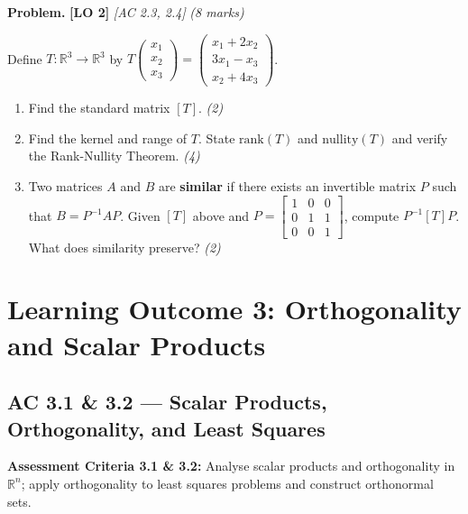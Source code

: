 \documentclass[12pt,a4paper]{article}
\newcommand{\lo}[1]{\textcolor{locolor}{\textbf{[LO #1]}}}
\newcommand{\ac}[1]{\textcolor{locolor}{\textit{[AC #1]}}}
\newcommand{\R}{\mathbb{R}}
\newcommand{\mat}[1]{\begin{bmatrix}#1\end{bmatrix}}
\begin{document}
	\begin{tcolorbox}[practice]
		\textbf{Problem.} \lo{2} \ac{2.3, 2.4} \hfill \textit{(8 marks)}
		
		Define $T:\R^3\to\R^3$ by $T\!\begin{pmatrix}x_1\\x_2\\x_3\end{pmatrix}=\begin{pmatrix}x_1+2x_2\\3x_1-x_3\\x_2+4x_3\end{pmatrix}$.
		
		\begin{enumerate}[label=(\alph*)]
			\item Find the standard matrix $[T]$. \hfill\textit{(2)}
			\item Find the kernel and range of $T$. State $\text{rank}(T)$ and $\text{nullity}(T)$ and verify the Rank-Nullity Theorem. \hfill\textit{(4)}
			\item Two matrices $A$ and $B$ are \textbf{similar} if there exists an invertible matrix $P$ such that $B = P^{-1}AP$.
			Given $[T]$ above and $P=\mat{1&0&0\\0&1&1\\0&0&1}$, compute $P^{-1}[T]P$.
			What does similarity preserve? \hfill\textit{(2)}
		\end{enumerate}
	\end{tcolorbox}
	
	\begin{tcolorbox}[answer]
	\end{tcolorbox}
	
	\newpage
	
	\section{Learning Outcome 3: Orthogonality and Scalar Products}
	
	\subsection{AC 3.1 \& 3.2 — Scalar Products, Orthogonality, and Least Squares}
	
	\begin{tcolorbox}[subtopic]
		\textbf{Assessment Criteria 3.1 \& 3.2:} Analyse scalar products and orthogonality in $\R^n$;
		apply orthogonality to least squares problems and construct orthonormal sets.
	\end{tcolorbox}
	
\end{document}
